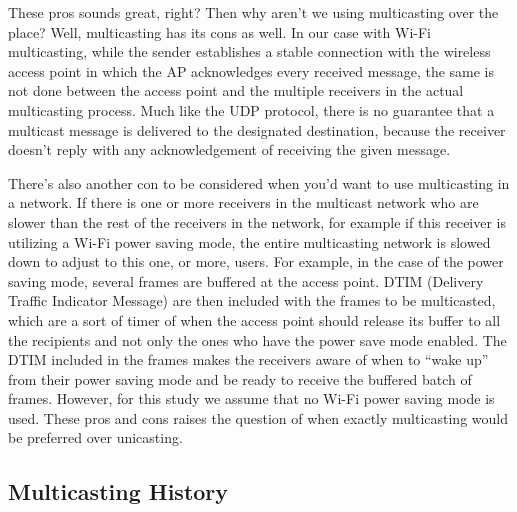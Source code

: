 \documentclass[9pt,a4paper]{acmproc}
\begin{document}
	These pros sounds great, right? Then why aren't we using multicasting over the place? Well, multicasting has its cons as well. In our case with Wi-Fi multicasting, while the sender establishes a stable connection with the wireless access point in which the AP acknowledges every received message, the same is not done between the access point and the multiple receivers in the actual multicasting process. Much like the UDP protocol, there is no guarantee that a multicast message is delivered to the designated destination, because the receiver doesn't reply with any acknowledgement of receiving the given message. \cite{udpSource}
	
	There's also another con to be considered when you'd want to use multicasting in a network. If there is one or more receivers in the multicast network who are slower than the rest of the receivers in the network, for example if this receiver is utilizing a Wi-Fi power saving mode, the entire multicasting network is slowed down to adjust to this one, or more, users. For example, in the case of the power saving mode, several frames are buffered at the access point. DTIM (Delivery Traffic Indicator Message) are then included with the frames to be multicasted, which are a sort of timer of when the access point should release its buffer to all the recipients and not only the ones who have the power save mode enabled. The DTIM included in the frames makes the receivers aware of when to “wake up” from their power saving mode and be ready to receive the buffered batch of frames. \cite{impMult} 
However, for this study we assume that no Wi-Fi power saving mode is used. These pros and cons raises the question of when exactly multicasting would be preferred over unicasting.
\newline
\newline



\subsection{Multicasting History}
\end{document}
